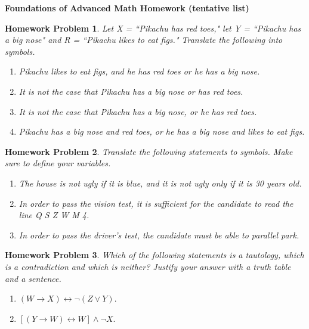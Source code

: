\documentclass{article}
\newtheorem{hw}{Homework Problem}
\begin{document}
	\Large \begin{center} {\bf Foundations of Advanced Math Homework (tentative list)}  \end{center}
	\normalsize

	\underline{\hspace{5in}}

	\begin{hw}
		Let X = ``Pikachu has red toes," let Y = ``Pikachu has a big nose" and R = ``Pikachu likes to eat figs."  Translate the following into symbols.
		\begin{enumerate}
			\item Pikachu likes to eat figs, and he has red toes or he has a big nose.
			\item It is not the case that Pikachu has a big nose or has red toes.
			\item It is not the case that Pikachu has a big nose, or he has red toes.
			\item Pikachu has a big nose and red toes, or he has a big nose and likes to eat figs.
		\end{enumerate}
	\end{hw}
	\begin{hw}
		Translate the following statements to symbols. Make sure to define your variables.
		\begin{enumerate}
			\item The house is not ugly if it is blue, and it is not ugly only if it is 30 years old.
			\item In order to pass the vision test, it is sufficient for the candidate to read the line Q S Z W M 4.
			\item In order to pass the driver's test, the candidate must be able to parallel park.
		\end{enumerate}
	\end{hw}
	\begin{hw}
		Which of the following statements is a tautology, which is a contradiction and which is neither? Justify your answer with a truth table and a sentence.
		\begin{enumerate}
			\item $(W \rightarrow X) \leftrightarrow \neg(Z \vee Y).$
			\item $[(Y \rightarrow W) \leftrightarrow W] \wedge \neg X.$
		\end{enumerate}
	\end{hw}
\end{document}
